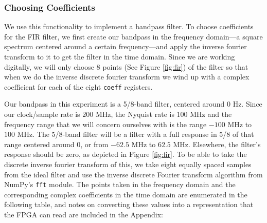 \documentclass[12pt]{article}
\begin{document}
\subsubsection{Choosing Coefficients}
We use this functionality to implement a bandpass filter. To choose coefficients for the FIR filter, we first create our bandpass in the frequency domain---a square spectrum centered around a certain frequency---and apply the inverse fourier transform to it to get the filter in the time domain. Since we are working digitally, we will only choose 8 points (See Figure \ref{fig:fir}) of the filter so that when we do the inverse discrete fourier transform we wind up with a complex coefficient for each of the eight \texttt{coeff} registers.

Our bandpass in this experiment is a 5/8-band filter, centered around $0$ Hz. Since our clock/sample rate is $200$ MHz, the Nyquist rate is $100$ MHz and the frequency range that we will concern ourselves with is the range $-100$ MHz to $100$ MHz. The 5/8-band filter will be a filter with a full response in 5/8 of that range centered around 0, or from $-62.5$ MHz to $62.5$ MHz. Elsewhere, the filter's response should be zero, as depicted in Figure \ref{fig:fir}. To be able to take the discrete inverse fourier transform of this, we take eight equally spaced samples from the ideal filter and use the inverse discrete Fourier transform algorithm from NumPy's \texttt{fft} module. The points taken in the frequency domain and the corresponding complex coefficients in the time domain are enumerated in the following table, and notes on converting these values into a representation that the FPGA can read are included in the Appendix:
\end{document}
